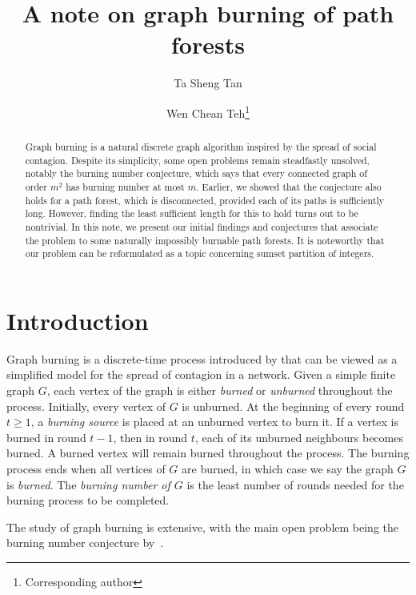 \documentclass[
final
]{dmtcs-episciences}
\author[Ta Sheng Tan and Wen Chean Teh]{Ta Sheng Tan\affiliationmark{1}
  \and Wen Chean Teh\affiliationmark{2}\thanks{Corresponding author} }
\title[A note on graph burning of path forests]{
A note on graph burning of path forests
}
\affiliation{
  Institute of Mathematical Sciences, Faculty of Science,  University Malaya,  Malaysia\\
  School of Mathematical Sciences,  Universiti Sains Malaysia,  Malaysia}
\theoremstyle{definition}
\theoremstyle{remark}
\begin{document}

\maketitle
\begin{abstract}
 Graph burning is a natural discrete graph algorithm inspired by the spread of social contagion. Despite its simplicity, some open problems remain steadfastly unsolved, notably the burning number conjecture, which says that every connected graph of order $m^2$ has burning number at most $m$. Earlier, we showed that the conjecture also holds for a path forest, which is disconnected, provided each of its paths is sufficiently long. However, finding the least sufficient length for this to hold turns out to be nontrivial. In this note, we present our initial findings and conjectures that associate the problem to some naturally impossibly burnable path forests. It is noteworthy that our problem can be reformulated as a topic concerning sumset partition of integers.
\end{abstract}

\section{Introduction}\label{intro}


Graph burning is a discrete-time process introduced by \citet{bonato2016how}
that can be viewed as a simplified model for the spread of contagion in a network.
Given a simple finite graph $G$, each vertex of the graph is either \emph{burned} or \emph{unburned} throughout the process.
Initially, every vertex of $G$ is unburned.
At the beginning of every round $t\ge 1$, a \emph{burning source} is placed at an unburned vertex to burn it.
If a vertex is burned in round $t-1$, then in round $t$, each of its unburned neighbours becomes burned.
A burned vertex will remain burned throughout the process.
The burning process ends when all vertices of $G$ are burned, in which case we say the graph $G$ is \emph{burned}.
The \emph{burning number of $G$} is the least number of rounds needed for the burning process to be completed.

The study of graph burning is extensive, with the main open problem being the burning number conjecture by~\citet{bonato2016how}.
\end{document}
